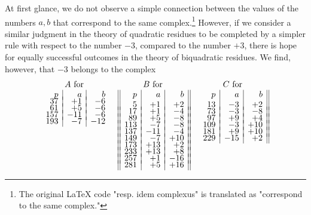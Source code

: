 \documentclass[twoside,12pt, showframe]{memoir}
\renewenvironment{quote}%
  {\list{}{\leftmargin=5em\rightmargin=0em}\item[]}%
  {\endlist}
\begin{document}
\begin{quote}
  At first glance, we do not observe a simple connection between the values of the numbers \(a, b\) that correspond to the same complex.\footnote{The original \LaTeX{} code "resp. idem complexus" is translated as "correspond to the same complex."} However, if we consider a similar judgment in the theory of quadratic residues to be completed by a simpler rule with respect to the number \(-3\), compared to the number \(+3\), there is hope for equally successful outcomes in the theory of biquadratic residues. We find, however, that \(-3\) belongs to the complex
  \[\begin{array}{cccc}
    \begin{array}[t]{r|r|r} 
      \multicolumn{3}{c}{A\text{ for }}\\
      p & a & b \\[-4pt]
      37&+1&-6\\[-4pt]
      61&+5&-6\\[-4pt]
      157&-11&-6\\[-4pt]
      193 & -7 & -12 
    \end{array} & 
    \begin{array}[t]{||r|r|r||} 
      \multicolumn{3}{c}{B\text{ for }}\\
      p & a & b \\
      5&+1&+2\\[-4pt]
      17&+1&-4\\[-4pt]
      89&+5&-8\\[-4pt]
      113&-7&-8\\[-4pt]
      137&-11&-4\\[-4pt]
      149&-7&+10\\[-4pt]
      173&+13&+2\\[-4pt]
      233&+13&+8\\[-4pt]
      257&+1&-16\\[-4pt]
      281&+5&+16
    \end{array}&
    \begin{array}[t]{r|r|r||} 
      \multicolumn{3}{c}{C\text{ for }}\\
      p & a & b \\
      13 & -3 & +2 \\[-4pt]
      73&-3&-8\\[-4pt]
      97&+9&+4\\[-4pt]
      109 & -3 & +10 \\[-4pt]
      181 & +9 & +10 \\[-4pt]
      229 & -15 & +2 \\[-4pt]

\end{array}
\end{array}\]
\end{quote}
\end{document}
